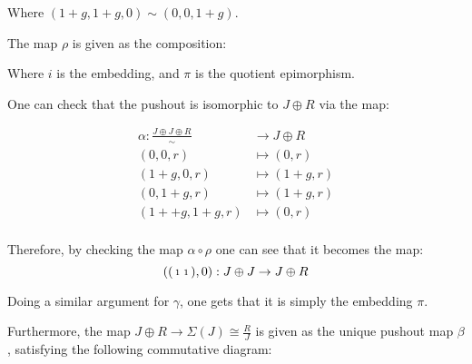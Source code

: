 Where \( (1 + g, 1 + g, 0) \sim (0, 0, 1 + g) \).

The map \( \rho \) is given as the composition:
\begin{center}
\end{center}

Where \( i \) is the embedding, and \( \pi \) is the quotient epimorphism.

One can check that the pushout is isomorphic to \( J \oplus R \) via the map:

\begin{align*}
	\alpha: \frac{J \oplus J \oplus R}{\sim} &\to J \oplus R \\
	(0, 0, r) &\mapsto (0, r) \\
	(1 + g, 0, r) &\mapsto (1 + g, r) \\
	(0, 1 + g, r) &\mapsto (1 + g, r) \\
	(1+ + g, 1 + g, r) &\mapsto (0, r) \\
\end{align*}

Therefore, by checking the map \( \alpha \circ \rho \) one can see that it becomes the map:
\[ 
	(\begin{psmallmatrix}
		1 & 1 \\
	\end{psmallmatrix}, 0):  J \oplus J \to J \oplus R
\]

Doing a similar argument for \( \gamma \), one gets that it is simply the embedding \( \pi \).

Furthermore, the map \( J \oplus R \to \Sigma(J) \cong \frac{R}{J} \) is given as the unique pushout map \( \beta \), satisfying the following commutative diagram:

\begin{center}
\end{center}

